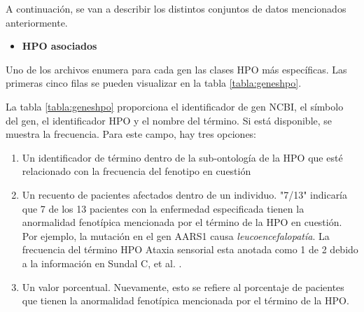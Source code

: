 A continuación, se van a describir los distintos conjuntos de datos mencionados anteriormente.

\begin{itemize}
	\item \textbf{HPO asociados}
\end{itemize}

Uno de los archivos enumera para cada gen las clases HPO más específicas. Las primeras cinco filas se pueden visualizar en la tabla \ref{tabla:geneshpo}.

\renewcommand{\arraystretch}{1.5} %

\begin{table}[h!]
	\centering
	\caption{Cabecera del archivo de HPO asociados}
	\label{tabla:geneshpo}
\end{table}

La tabla \ref{tabla:geneshpo} proporciona el identificador de gen NCBI, el símbolo del gen, el identificador HPO y el nombre del término. Si está disponible, se muestra la frecuencia. Para este campo, hay tres opciones:

\begin{enumerate}
	\item Un identificador de término dentro de la sub-ontología de la HPO que esté relacionado con la frecuencia del fenotipo en cuestión
	\item Un recuento de pacientes afectados dentro de un individuo. "7/13" indicaría que 7 de los 13 pacientes con la enfermedad especificada tienen la anormalidad fenotípica mencionada por el término de la HPO en cuestión. Por ejemplo, la mutación en el gen AARS1 causa \textit{leucoencefalopatía}. La frecuencia del término HPO Ataxia sensorial esta anotada como 1 de 2 debido a la información en Sundal C, et al. \cite{Sundal2019}. 
	\item Un valor porcentual. Nuevamente, esto se refiere al porcentaje de pacientes que tienen la anormalidad fenotípica mencionada por el término de la HPO.
\end{enumerate}

